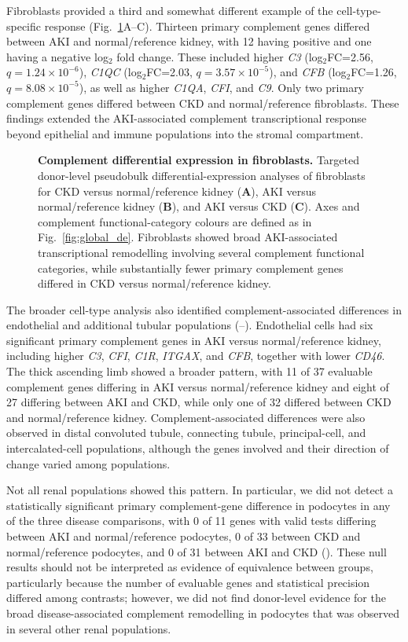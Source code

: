 \documentclass[10pt,letterpaper]{article}
\begin{document}
Fibroblasts provided a third and somewhat different example of the cell-type-specific response (Fig.~\ref{fig:fibroblast_de}A--C). Thirteen primary complement genes differed between AKI and normal/reference kidney, with 12 having positive and one having a negative log$_2$ fold change. These included higher \textit{C3} (log$_2$FC=2.56, $q=1.24\times10^{-6}$), \textit{C1QC} (log$_2$FC=2.03, $q=3.57\times10^{-5}$), and \textit{CFB} (log$_2$FC=1.26, $q=8.08\times10^{-5}$), as well as higher \textit{C1QA}, \textit{CFI}, and \textit{C9}. Only two primary complement genes differed between CKD and normal/reference fibroblasts. These findings extended the AKI-associated complement transcriptional response beyond epithelial and immune populations into the stromal compartment.

\begin{figure}[!h]
\caption{\textbf{Complement differential expression in fibroblasts.}
Targeted donor-level pseudobulk differential-expression analyses of fibroblasts for CKD versus normal/reference kidney (\textbf{A}), AKI versus normal/reference kidney (\textbf{B}), and AKI versus CKD (\textbf{C}). Axes and complement functional-category colours are defined as in Fig.~\ref{fig:global_de}. Fibroblasts showed broad AKI-associated transcriptional remodelling involving several complement functional categories, while substantially fewer primary complement genes differed in CKD versus normal/reference kidney.}
\label{fig:fibroblast_de}
\end{figure}

The broader cell-type analysis also identified complement-associated differences in endothelial and additional tubular populations (--). Endothelial cells had six significant primary complement genes in AKI versus normal/reference kidney, including higher \textit{C3}, \textit{CFI}, \textit{C1R}, \textit{ITGAX}, and \textit{CFB}, together with lower \textit{CD46}. The thick ascending limb showed a broader pattern, with 11 of 37 evaluable complement genes differing in AKI versus normal/reference kidney and eight of 27 differing between AKI and CKD, while only one of 32 differed between CKD and normal/reference kidney. Complement-associated differences were also observed in distal convoluted tubule, connecting tubule, principal-cell, and intercalated-cell populations, although the genes involved and their direction of change varied among populations.

Not all renal populations showed this pattern. In particular, we did not detect a statistically significant primary complement-gene difference in podocytes in any of the three disease comparisons, with 0 of 11 genes with valid tests differing between AKI and normal/reference podocytes, 0 of 33 between CKD and normal/reference podocytes, and 0 of 31 between AKI and CKD (). These null results should not be interpreted as evidence of equivalence between groups, particularly because the number of evaluable genes and statistical precision differed among contrasts; however, we did not find donor-level evidence for the broad disease-associated complement remodelling in podocytes that was observed in several other renal populations.
\end{document}
